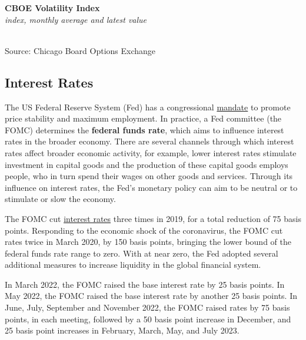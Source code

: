 \documentclass{report}
\makeatletter
\newcommand{\tbllink}[1]{\href{https://raw.githubusercontent.com/bdecon/US-chartbook/master/chartbook/data/#1}{\faTable}}
\newcommand*\short[1]{\expandafter\@gobbletwo\number\numexpr#1\relax}
\newcommand{\dateaxisticks}{
		date coordinates in=x, axis line style={draw=none},
		xmax={2023-11-30},
		max space between ticks=40,	    
		xtick={{1990-01-01}, {1992-01-01}, {1994-01-01}, 
			{1996-01-01}, {1998-01-01}, {2000-01-01}, 
			{2002-01-01}, {2004-01-01}, {2006-01-01},
			{2008-01-01}, {2010-01-01}, {2012-01-01}, {2014-01-01},
		    {2016-01-01}, {2018-01-01}, {2020-01-01}, {2022-01-01}, 
		    {2024-01-01}, {2026-01-01}},
		minor xtick={{1989-01-01}, {1991-01-01}, {1993-01-01},
			{1995-01-01}, {1997-01-01}, {1999-01-01}, 
			{2001-01-01}, {2003-01-01}, {2005-01-01}, {2007-01-01},
		    {2009-01-01}, {2011-01-01}, {2013-01-01}, {2015-01-01},
		    {2017-01-01}, {2019-01-01}, {2021-01-01}, {2023-01-01}, 
		    {2025-01-01}, {2027-01-01}},
		enlarge y limits={0.06}, enlarge x limits={0.01},
		xticklabel style={align=center, yshift=-2pt}, tick label style={inner sep=0pt},
		}
\newcommand{\bbar}[2]{extra #1 ticks = {{#2}}, extra #1 tick labels = ,
		extra #1 tick style = {grid=major, grid style={thick, black!25}},}
\newcommand{\stdline}[4]{\addplot[very thick, no markers, color=#1] 
		table [x=#2, y=#3, col sep=comma] {#4};	}
\newcommand{\rbars}{
		\fill[color=black!10] (axis cs:{1990-07-01},\pgfkeysvalueof{/pgfplots/ymin}) rectangle 
			(axis cs:{1991-03-01}, \pgfkeysvalueof{/pgfplots/ymax});
		\fill[color=black!10] (axis cs:{2007-12-01},\pgfkeysvalueof{/pgfplots/ymin}) rectangle 
			(axis cs:{2009-07-01}, \pgfkeysvalueof{/pgfplots/ymax});
		\fill[color=black!10] (axis cs:{2001-03-01},\pgfkeysvalueof{/pgfplots/ymin}) rectangle 
			(axis cs:{2001-11-01}, \pgfkeysvalueof{/pgfplots/ymax});
		\fill[color=black!10] (axis cs:{2020-02-01},\pgfkeysvalueof{/pgfplots/ymin}) rectangle 
			(axis cs:{2020-05-01}, \pgfkeysvalueof{/pgfplots/ymax});}
\makeatother
\begin{document}
{\begin{minipage}{0.76\textwidth}
\normalsize \textbf{CBOE Volatility Index}\\
\footnotesize{\textit{index, monthly average and latest value}}\\
\hspace*{-1mm} \\
\footnotesize{Source: Chicago Board Options Exchange} \hfill \tbllink{vix.csv}
\end{minipage}
\newpage
\begin{minipage}{0.76\textwidth}    
\subsection*{Interest Rates}
\hypertarget{capint}{\label{capint}}
\small The US Federal Reserve System (Fed) has a congressional \href{https://www.federalreserve.gov/faqs/money_12848.htm}{mandate} to promote price stability and maximum employment. In practice, a Fed committee (the FOMC) determines the \textbf{federal funds rate}, which aims to influence interest rates in the broader economy. There are several channels through which interest rates affect broader economic activity, for example, lower interest rates stimulate investment in capital goods and the production of these capital goods employs people, who in turn spend their wages on other goods and services. Through its influence on interest rates, the Fed's monetary policy can aim to be neutral or to stimulate or slow the economy.

The FOMC cut \href{https://www.federalreserve.gov/releases/h15/}{interest rates} three times in 2019, for a total reduction of 75 basis points. Responding to the economic shock of the coronavirus, the FOMC cut rates twice in March 2020, by 150 basis points, bringing the lower bound of the federal funds rate range to zero. With at near zero, the Fed adopted several additional measures to increase liquidity in the global financial system.

In March 2022, the FOMC raised the base interest rate by 25 basis points. In May 2022, the FOMC raised the base interest rate by another 25 basis points. In June, July, September and November 2022, the FOMC raised rates by 75 basis points, in each meeting, followed by a 50 basis point increase in December, and 25 basis point increases in February, March, May, and July 2023. 
\vspace{2mm}


\end{minipage}}
\end{document}
